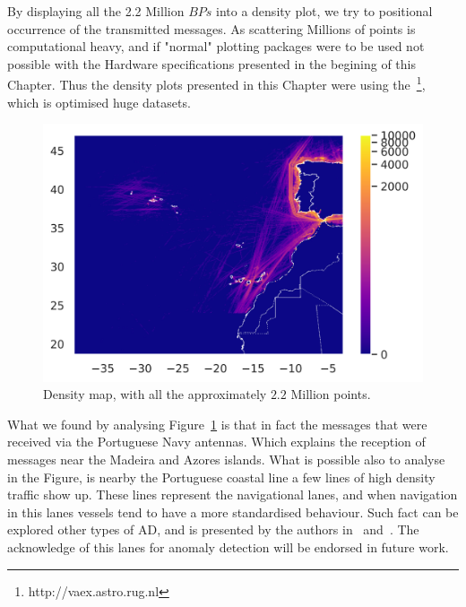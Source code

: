 By displaying all the 2.2 Million $BPs$ into a density plot, we try to positional occurrence of the transmitted messages. As scattering Millions of points is computational heavy, and if "normal" plotting packages were to be used not possible with the Hardware specifications presented in the begining of this Chapter. Thus the density plots presented in this Chapter were using the~\footnote{http://vaex.astro.rug.nl}, which is optimised huge datasets. 

\begin{figure}[H]
	\centering
	\includegraphics[width=\textwidth]{figures/Ch5/ThesisExpDensity.png}
    \caption{Density map, with all the approximately
    $2.2$ Million points.}
    \label{fig: 5 Exp1DensityMap}
\end{figure}

What we found by analysing Figure~\ref{fig: 5 Exp1DensityMap} is that in fact the messages that were received via the Portuguese Navy antennas. Which explains the reception of messages near the Madeira and Azores islands.  What is possible also to analyse in the Figure, is nearby the Portuguese coastal line a few lines of high density traffic show up. These lines represent the navigational lanes, and when navigation in this lanes vessels tend to have a more standardised behaviour. Such fact can be explored other types of AD, and is presented by the authors in~\cite{Yan2016} and~\cite{Silveira2013UsePortugal}. The acknowledge of this lanes for anomaly detection will be endorsed in future work.


